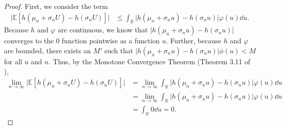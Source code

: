 \begin{proof}
    First, we consider the term
    \begin{align*}
        \lvert \mathbb{E}[h(\mu_n + \sigma_n U) - h(\sigma_n U)] \rvert
        & \leq
        \int_{\mathbb{R}} \lvert h(\mu_n + \sigma_n u) - h(\sigma_n u) \rvert \varphi(u) \dd u.
    \end{align*}
    Because $h$ and $\varphi$ are continuous, we know that $\lvert h(\mu_n + \sigma_n u) - h(\sigma_n u) \rvert$ converges to the 0 function pointwise as a function $u$.
    Further, because $h$ and $\varphi$ are bounded, there exists an $M'$ such that $\lvert h(\mu_n + \sigma_n u) - h(\sigma_n u) \rvert \phi(u) < M$ for all $u$ and $n$.
    Thus, by the Monotone Convergence Theorem (Theorem 3.11 of \cite{axler2020}),
    \begin{align*}
        \lim_{n \to \infty} \lvert \mathbb{E}[h(\mu_n + \sigma_n U) - h(\sigma_n U)] \rvert
        & = \lim_{n\to\infty} \int_{\mathbb{R}} \lvert h(\mu_n + \sigma_n u) - h(\sigma_n u) \rvert \varphi(u) \dd u \\
        & = \lim_{n\to\infty} \int_{\mathbb{R}} \lvert h(\mu_n + \sigma_n u) - h(\sigma_n u) \rvert \varphi(u) \dd u \\
        & =  \int_{\mathbb{R}} 0 \dd u
         = 0.
    \end{align*}


\end{proof}
